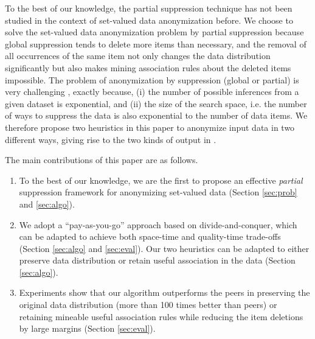 To the best of our knowledge, the partial suppression technique
has not been studied in the context of set-valued data anonymization before.
We choose to solve the set-valued data anonymization problem by partial
suppression because global suppression tends to 
delete more items than necessary,
and the removal of all occurrences of the same item not only changes the
data distribution significantly but also makes mining association rules
about the deleted items impossible.
%
The problem of anonymization by suppression (global or partial) is very
challenging \cite{atallah99:disclosure,Xu:2008:ATD}, exactly because, (i) the number of possible inferences from
a given dataset is exponential, and (ii) the size of the search space, i.e.
the number of ways to suppress the data is also exponential to the number of
data items. We therefore propose two heuristics in this paper to anonymize
input data in two different ways, giving rise to the two kinds of output
in .

The main contributions of this paper are as follows.
\begin{enumerate}
\item To the best of our knowledge, we are the first to propose an
    effective \emph{partial} suppression framework for anonymizing
    set-valued data (Section \ref{sec:prob} and
    \ref{sec:algo}). 
\item We adopt a ``pay-as-you-go'' approach based on divide-and-conquer,
    which can be adapted to achieve both space-time and quality-time
    trade-offs (Section \ref{sec:algo} and \ref{sec:eval}). Our two heuristics
    can be adapted to either preserve data distribution or retain useful
    association in the data (Section \ref{sec:algo}).
\item Experiments show that our algorithm outperforms 
    the peers in preserving the
    original data distribution (more than 100 times better
    than peers)
    or retaining mineable useful association
    rules while reducing the item deletions 
    by large margins (Section \ref{sec:eval}).
\end{enumerate}
